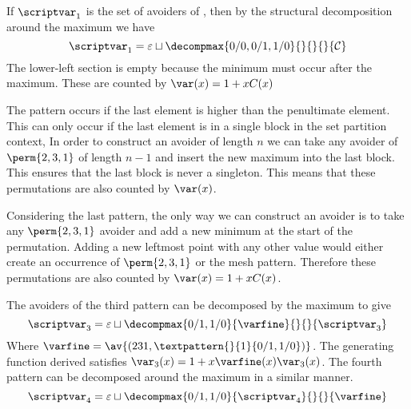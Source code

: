 If \(\scriptvar_1\) is the set of avoiders of
, then by the structural
decomposition around the maximum we have
\begin{equation*}
    \scriptvar_1 = \varepsilon \sqcup
    \decompmax{0/0,0/1,1/0}{}{}{}{\mathcal{C}}
\end{equation*}
The lower-left section is empty because the minimum must occur after the maximum.
These are counted by \(\var(x) = 1+xC(x)\)

The pattern  occurs if
the last element is higher than the penultimate element. This can only occur
if the last element is in a single block in the set partition context, In order
to construct an avoider of length \(n\) we can take any avoider of
\(\perm{2,3,1}\) of length \(n-1\) and insert the new maximum into the last
block.  This ensures that the last block is never a singleton. This means
that these permutations are also counted by \(\var(x)\).

Considering the last pattern, the only way we can construct an
avoider is to take any \(\perm{2,3,1}\) avoider and add a new minimum
at the start of the permutation. Adding a new leftmost point with any other
value would either create an occurrence of \(\perm{2,3,1}\) or the mesh pattern.
Therefore these permutations are also counted by \(\var(x) = 1+xC(x)\).

The avoiders of the third pattern can be decomposed by the maximum
to give
\begin{equation*}
    \scriptvar_3 = \varepsilon \sqcup
    \decompmax{0/1,1/0}{\mathcal{\varfine}}{}{}{\scriptvar_3}
\end{equation*}
Where \(\mathcal{\varfine} = \av{(231,\textpattern{}{1}{0/1,1/0})}\).
The generating function derived satisfies \(\var_3(x) = 1 + x\varfine(x)\var_3(x)\).
The fourth pattern can be decomposed around the maximum in a similar
manner.
\begin{equation*}
    \scriptvar_4 = \varepsilon \sqcup
    \decompmax{0/1,1/0}{\scriptvar_4}{}{}{\mathcal{\varfine}}
\end{equation*}

